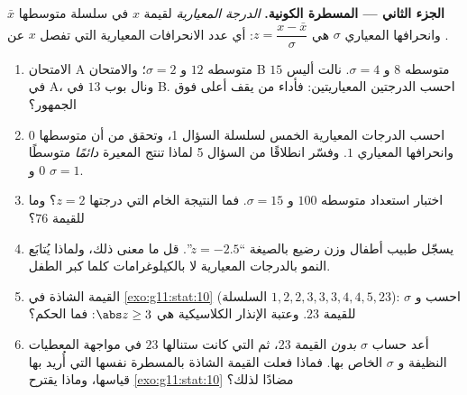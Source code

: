 \begin{problem}
\medskip
\noindent\textbf{الجزء الثاني --- المسطرة الكونية.}
\emph{الدرجة المعيارية} لقيمة $x$ في سلسلة
متوسطها $\bar x$ وانحرافها المعياري $\sigma$ هي
$z = \dfrac{x - \bar x}{\sigma}$: أي عدد الانحرافات
المعيارية التي تفصل $x$ عن .
\begin{enumerate}[resume]
  \item الامتحان A متوسطه $12$ و $\sigma = 2$؛ والامتحان B متوسطه
        $8$ و $\sigma = 4$. نالت أليس $15$ في A، ونال بوب $13$
        في B. احسب الدرجتين المعياريتين: فأداء من يقف
        أعلى فوق الجمهور؟
  \item احسب الدرجات المعيارية الخمس لسلسلة السؤال 1،
        وتحقق من أن متوسطها $0$ وانحرافها المعياري
        $1$. وفسّر انطلاقًا من السؤال 5 لماذا تنتج
        المعيرة \emph{دائمًا} متوسطًا $0$ و
        $\sigma = 1$.
  \item اختبار استعداد متوسطه $100$ و $\sigma = 15$. فما
        النتيجة الخام التي درجتها $z = 2$؟ وما  للقيمة $76$؟
  \item يسجّل طبيب أطفال وزن رضيع بالصيغة
        ``$z = -2.5$''. قل ما معنى ذلك، ولماذا يُتابَع النمو
        بالدرجات المعيارية لا بالكيلوغرامات كلما كبر الطفل.
  \item القيمة الشاذة في \cref{exo:g11:stat:10} (السلسلة
        $1, 2, 2, 3, 3, 3, 4, 4, 5, 23$): احسب  و
        $\sigma$  للقيمة $23$. وعتبة الإنذار
        الكلاسيكية هي $\abs z \geq 3$: فما الحكم؟
  \item أعد حساب $\sigma$ \emph{بدون} القيمة $23$، ثم
         التي كانت ستنالها $23$ في مواجهة 
        المعطيات النظيفة و $\sigma$ الخاص بها. فماذا فعلت القيمة الشاذة
        بالمسطرة نفسها التي أُريد بها قياسها، وماذا
        يقترح \cref{exo:g11:stat:10} مضادًا لذلك؟
\end{enumerate}


\end{problem}
